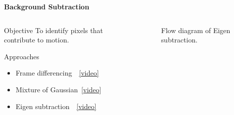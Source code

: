 \begin{frame}{\textbf{Background Subtraction}}

\begin{columns}
	\begin{column}{0.48\textwidth}
		\begin{varblock}[\textwidth]{Objective}
			To identify pixels that contribute to motion.
		\end{varblock}
		\begin{varblock}[\textwidth]{Approaches}
			\begin{itemize}							
				\item Frame differencing~~\href{run:videos/bgsub/fd.avi}{{\color{red}[video]}}
				\item Mixture of Gaussian\footnotemark~\href{run:videos/bgsub/mog.avi}{{\color{red}[video]}}
				\item Eigen subtraction~~\href{run:videos/bgsub/es.avi}{{\color{red}[video]}}		
			\end{itemize}
		\end{varblock}
	\end{column}
	\begin{column}{0.49\textwidth}
		\begin{figure}
			\centering
			\caption{Flow diagram of Eigen subtraction.}
		\end{figure}
	\end{column}
\end{columns}
\end{frame}